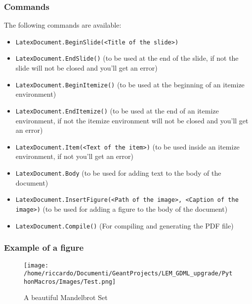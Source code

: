 \documentclass[8pt]{beamer}
\begin{document}
        \begin{frame}
            \frametitle{Commands}
        
The following commands are available:

        \begin{itemize}
        
        \item \texttt{LatexDocument.BeginSlide(<Title of the slide>)}
        
        \item \texttt{LatexDocument.EndSlide()} (to be used at the end of the slide, if not the slide will not be closed and you'll get an error)
        
        \item \texttt{LatexDocument.BeginItemize()} (to be used at the beginning of an itemize environment)
        
        \item \texttt{LatexDocument.EndItemize()} (to be used at the end of an itemize environment, if not the itemize environment will not be closed and you'll get an error)
        
        \item \texttt{LatexDocument.Item(<Text of the item>)} (to be used inside an itemize environment, if not you'll get an error)
        
        \item \texttt{LatexDocument.Body} (to be used for adding text to the body of the document)
        
        \item \texttt{LatexDocument.InsertFigure(<Path of the image>, <Caption of the image>)} (to be used for adding a figure to the body of the document)
        
        \item \texttt{LatexDocument.Compile()} (For compiling and generating the PDF file)
        
        \end{itemize}
        
        \end{frame}
        
        \begin{frame}
            \frametitle{Example of a figure}
        
        \begin{figure}[h]
            \centering
            \texttt{[image: /home/riccardo/Documenti/GeantProjects/LEM\_GDML\_upgrade/PythonMacros/Images/Test.png]}
            \caption{A beautiful Mandelbrot Set}
        \end{figure}
        
        \end{frame}
        
\end{document}
